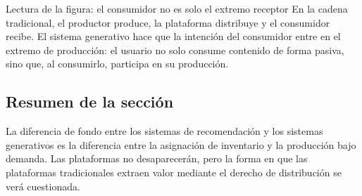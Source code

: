 \begin{knowledgebox}{Lectura de la figura: el consumidor no es solo el extremo receptor}
En la cadena tradicional, el productor produce, la plataforma distribuye y el consumidor recibe. El sistema generativo hace que la intención del consumidor entre en el extremo de producción: el usuario no solo consume contenido de forma pasiva, sino que, al consumirlo, participa en su producción.
\end{knowledgebox}

\subsection{Resumen de la sección}

La diferencia de fondo entre los sistemas de recomendación y los sistemas generativos es la diferencia entre la asignación de inventario y la producción bajo demanda. Las plataformas no desaparecerán, pero la forma en que las plataformas tradicionales extraen valor mediante el derecho de distribución se verá cuestionada.
